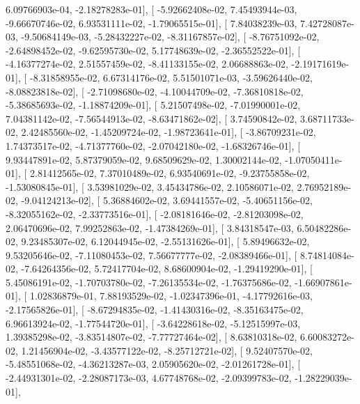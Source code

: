 \documentclass{article}
\begin{document}
          6.09766903e-04,  -2.18278283e-01],
       [ -5.92662408e-02,   7.45493944e-03,  -9.66670746e-02,
          6.93531111e-02,  -1.79065515e-01],
       [  7.84038239e-03,   7.42728087e-03,  -9.50684149e-03,
         -5.28432227e-02,  -8.31167857e-02],
       [ -8.76751092e-02,  -2.64898452e-02,  -9.62595730e-02,
          5.17748639e-02,  -2.36552522e-01],
       [ -4.16377274e-02,   2.51557459e-02,  -8.41133155e-02,
          2.06688863e-02,  -2.19171619e-01],
       [ -8.31858955e-02,   6.67314176e-02,   5.51501071e-03,
         -3.59626440e-02,  -8.08823818e-02],
       [ -2.71098680e-02,  -4.10044709e-02,  -7.36810818e-02,
         -5.38685693e-02,  -1.18874209e-01],
       [  5.21507498e-02,  -7.01990001e-02,   7.04381142e-02,
         -7.56544913e-02,  -8.63471862e-02],
       [  3.74590842e-02,   3.68711733e-02,   2.42485560e-02,
         -1.45209724e-02,  -1.98723641e-01],
       [ -3.86709231e-02,   1.74373517e-02,  -4.71377760e-02,
         -2.07042180e-02,  -1.68326746e-01],
       [  9.93447891e-02,   5.87379059e-02,   9.68509629e-02,
          1.30002144e-02,  -1.07050411e-01],
       [  2.81412565e-02,   7.37010489e-02,   6.93540691e-02,
         -9.23755858e-02,  -1.53080845e-01],
       [  3.53981029e-02,   3.45434786e-02,   2.10586071e-02,
          2.76952189e-02,  -9.04124213e-02],
       [  5.36884602e-02,   3.69441557e-02,  -5.40651156e-02,
         -8.32055162e-02,  -2.33773516e-01],
       [ -2.08181646e-02,  -2.81203098e-02,   2.06470696e-02,
          7.99252863e-02,  -1.47384269e-01],
       [  3.84318547e-03,   6.50482286e-02,   9.23485307e-02,
          6.12044945e-02,  -2.55131626e-01],
       [  5.89496632e-02,   9.53205646e-02,  -7.11080453e-02,
          7.56677777e-02,  -2.08389466e-01],
       [  8.74814084e-02,  -7.64264356e-02,   5.72417704e-02,
          8.68600904e-02,  -1.29419290e-01],
       [  5.45086191e-02,  -1.70703780e-02,  -7.26135534e-02,
         -1.76375686e-02,  -1.66907861e-01],
       [  1.02836879e-01,   7.88193529e-02,  -1.02347396e-01,
         -4.17792616e-03,  -2.17565826e-01],
       [ -8.67294835e-02,  -1.41430316e-02,  -8.35163475e-02,
          6.96613924e-02,  -1.77544720e-01],
       [ -3.64228618e-02,  -5.12515997e-03,   1.39385298e-02,
         -3.83514807e-02,  -7.77727464e-02],
       [  8.63810318e-02,   6.60083272e-02,   1.21456904e-02,
         -3.43577122e-02,  -8.25712721e-02],
       [  9.52407570e-02,  -5.48551068e-02,  -4.36213287e-03,
          2.05905620e-02,  -2.01261728e-01],
       [ -2.44931301e-02,  -2.28087173e-03,   4.67748768e-02,
         -2.09399783e-02,  -1.28229039e-01],
\end{document}
